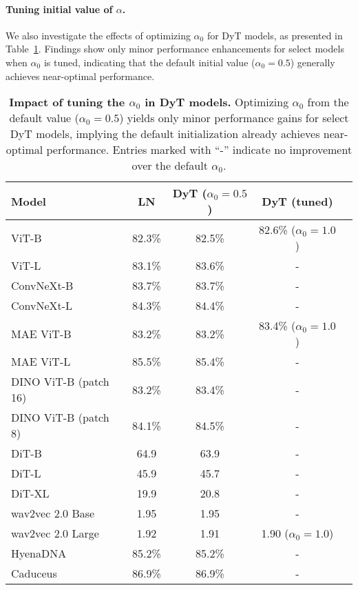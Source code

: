 \paragraph{Tuning initial value of $\alpha$.} We also investigate the effects of optimizing $\alpha_0$ for DyT models, as presented in Table~\ref{table:tune_alpha}. Findings show only minor performance enhancements for select models when $\alpha_0$ is tuned, indicating that the default initial value ($\alpha_0 = 0.5$) generally achieves near-optimal performance.



\begin{table}[h]
\vskip -0.07in
\centering
{}
\begin{tabular}{lcccc}
\toprule
Model & LN  & DyT ($\alpha_0 = 0.5$) & DyT (tuned) \\
\midrule
ViT-B & 82.3\% & 82.5\% & 82.6\% \scriptsize{($\alpha_0 = 1.0$)} \\
ViT-L & 83.1\% & 83.6\% & - \\
ConvNeXt-B & 83.7\% & 83.7\% & - \\
ConvNeXt-L & 84.3\% & 84.4\% & - \\
\midrule
MAE ViT-B & 83.2\% & 83.2\% & 83.4\% \scriptsize{($\alpha_0 = 1.0$)} \\
MAE ViT-L & 85.5\% & 85.4\% & - \\
DINO ViT-B (patch 16) & 83.2\% & 83.4\% & - \\
DINO ViT-B (patch 8) & 84.1\% & 84.5\% & - \\
\midrule
DiT-B & 64.9 & 63.9 & - \\
DiT-L & 45.9 & 45.7 & - \\
DiT-XL & 19.9 & 20.8 & -  \\
\midrule
wav2vec 2.0 Base & 1.95 & 1.95 & - \\
wav2vec 2.0 Large & 1.92 & 1.91 & 1.90 \scriptsize{($\alpha_0 = 1.0$)} \\
\midrule
HyenaDNA & 85.2\% & 85.2\% & -  \\
Caduceus & 86.9\% & 86.9\% & - \\
\midrule
  \end{tabular}
 \caption{\textbf{Impact of tuning the $\alpha_0$ in DyT models.} Optimizing $\alpha_0$ from the default value ($\alpha_0 = 0.5$)  yields only minor performance gains for select DyT models, implying the default initialization already achieves near-optimal performance. Entries marked with ``-'' indicate no improvement over the default $\alpha_0$.
}
\label{table:tune_alpha}
\end{table}








